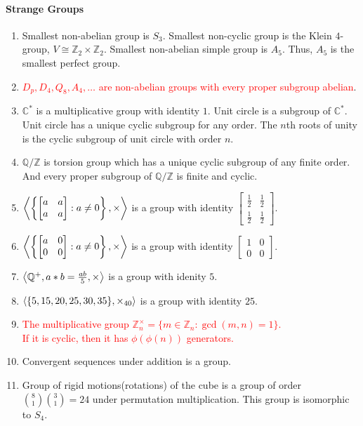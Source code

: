 \paragraph{Strange Groups}
\begin{enumerate}
	\item Smallest non-abelian group is $S_3$.
	Smallest non-cyclic group is the Klein $4$-group, $V \cong \mathbb{Z}_2 \times \mathbb{Z}_2$.
	Smallest non-abelian simple group is $A_5$. Thus, $A_5$ is the smallest perfect group.
	\item \textcolor{red}{$D_p, D_4, Q_8, A_4,\dots$ are non-abelian groups with every proper subgroup abelian}. 
	\item $\mathbb{C}^\ast$ is a multiplicative group with identity $1$.
	Unit circle is a subgroup of $\mathbb{C}^\ast$.
	Unit circle has a unique cyclic subgroup for any order.
	The $n$th roots of unity is the cyclic subgroup of unit circle with order $n$.
	\item $\mathbb{Q}/\mathbb{Z}$ is torsion group which has a unique cyclic subgroup of any finite order.
	And every proper subgroup of $\mathbb{Q}/\mathbb{Z}$ is finite and cyclic.
	\item $ \left\langle \left\{ \begin{bmatrix} a & a \\ a & a \end{bmatrix} : a \ne 0 \right\},\times \right\rangle$ is a group with identity $\begin{bmatrix} \frac{1}{2} & \frac{1}{2} \\ \frac{1}{2} & \frac{1}{2} \end{bmatrix}$.
	\item $ \left\langle \left\{ \begin{bmatrix} a & 0 \\ 0 & 0 \end{bmatrix} : a \ne 0 \right\},\times \right\rangle$ is a group with identity $\begin{bmatrix} 1 & 0 \\ 0 & 0 \end{bmatrix}$.
	\item $\left\langle \mathbb{Q}^+,a \ast b = \frac{ab}{5},\times \right\rangle$ is a group with idenity $5$.
	\item $\left\langle \{5,15,20,25,30,35\},\times_{40} \right\rangle$ is a group with identity $25$.
	\item \textcolor{red}{The multiplicative group $\mathbb{Z}_n^\times = \{ m \in \mathbb{Z}_n : \gcd(m,n)=1 \}$.\\
		If it is cyclic, then it has $\phi(\phi(n))$ generators.}
	\item Convergent sequences under addition is a group.
	\item Group of rigid motions(rotations) of the cube is a group of order $\binom{8}{1}\binom{3}{1}=24$ under permutation multiplication.
	This group is isomorphic to $S_4$.
\end{enumerate}

